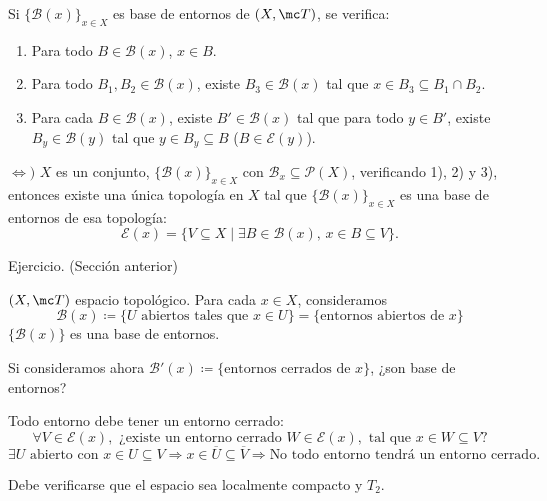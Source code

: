 Si \(\{\mathcal{B}(x)\}_{x \in X}\) es base de entornos de \((X, \mc T)\), se verifica:
\begin{enumerate}
    \item Para todo \(B \in \mathcal{B}(x)\), \(x \in B\).
    \item Para todo \(B_1, B_2 \in \mathcal{B}(x)\), existe \(B_3 \in \mathcal{B}(x)\) tal que \(x \in B_3 \subseteq B_1 \cap B_2\).
    \item Para cada \(B \in \mathcal{B}(x)\), existe \(B' \in \mathcal{B}(x)\) tal que para todo \(y \in B'\), existe \(B_y \in \mathcal{B}(y)\) tal que \(y \in B_y \subseteq B\) (\(B \in \mathcal{E}(y)\)).
\end{enumerate}


\begin{teo}
    \(\iff ) \) \(X\) es un conjunto, \(\{\mathcal{B}(x)\}_{x \in X}\) con \(\mathcal{B}_x \subseteq \mathcal{P}(X)\), verificando 1), 2) y 3), entonces existe una única topología en \(X\) tal que \(\{\mathcal{B}(x)\}_{x \in X}\) es una base de entornos de esa topología:
    \[
        \mathcal{E}(x) = \{ V \subseteq X \mid \exists B \in \mathcal{B}(x), \, x \in B \subseteq V \}.
    \]
\end{teo}

\begin{dem}
    Ejercicio. (Secci\'on anterior)
\end{dem}

\begin{ejem}
    \((X, \mc T)\) espacio topológico.   
    Para cada \(x \in X\), consideramos $$\mathcal{B}(x) \coloneqq \{ U \text{ abiertos tales que } x \in U \} = \{ \text{entornos abiertos de } x \}$$
    \(\{\mathcal{B}(x)\}\) es una base de entornos.
    
    Si consideramos ahora \(\mathcal{B}'(x) \coloneqq \{ \text{entornos cerrados de } x \}\), ¿son base de entornos?
    
    Todo entorno debe tener un entorno cerrado:
    \[
        \forall V \in \mathcal{E}(x), \text{ ¿existe un entorno cerrado } W \in \mathcal{E}(x), \text{ tal que } x \in W \subseteq V\text{?}
    \]
    \[
        \exists U \text{ abierto con } x \in U \subseteq V \Rightarrow x \in \overline{U} \subseteq \overline{V} \Rightarrow \text{No todo entorno tendrá un entorno cerrado.}
    \]
    \begin{obs}
        Debe verificarse que el espacio sea localmente compacto y \(T_2\).
    \end{obs}
\end{ejem}

